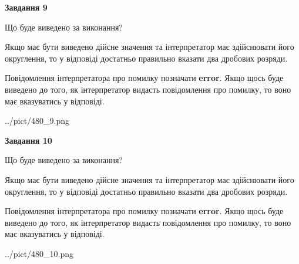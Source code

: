 \documentclass[12pt, ukrainian]{article}
\begin{document}
{\begin {Large}
{\begin {center}\textbf{Завдання 9}\end {center}}\par
Що буде виведено за виконання? \par

Якщо має бути виведено дійсне значення та інтерпретатор має здійснювати його округлення, 
то у відповіді достатньо правильно вказати два дробових розряди.

Повідомлення інтерпретатора про помилку позначати \textbf{error}.
Якщо щось буде виведено до того, як інтерпретатор видасть повідомлення про помилку, 
то воно має вказуватись у відповіді. \par

\begin{center}
	{../pict/480_9.png}
\end{center}
\newpage

{\begin {center}\textbf{Завдання 10}\end {center}}\par
Що буде виведено за виконання? \par

Якщо має бути виведено дійсне значення та інтерпретатор має здійснювати його округлення, 
то у відповіді достатньо правильно вказати два дробових розряди.

Повідомлення інтерпретатора про помилку позначати \textbf{error}.
Якщо щось буде виведено до того, як інтерпретатор видасть повідомлення про помилку, 
то воно має вказуватись у відповіді. \par

\begin{center}
	{../pict/480_10.png}
\end{center}
\newpage

\end {Large}}
\end{document}
